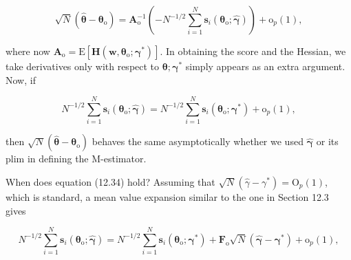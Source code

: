 \documentclass[10pt]{article}
\begin{document}
\begin{equation*}
\sqrt{N}\left(\hat{\boldsymbol{\theta}}-\boldsymbol{\theta}_{\mathrm{o}}\right)=\mathbf{A}_{\mathrm{o}}^{-1}\left(-N^{-1 / 2} \sum_{i=1}^{N} \mathbf{s}_{i}\left(\boldsymbol{\theta}_{\mathrm{o}} ; \hat{\boldsymbol{\gamma}}\right)\right)+\mathrm{o}_{p}(1), \tag{12.33}
\end{equation*}


where now $\mathbf{A}_{\mathrm{o}}=\mathrm{E}\left[\mathbf{H}\left(\mathbf{w}, \boldsymbol{\theta}_{\mathrm{o}} ; \boldsymbol{\gamma}^{*}\right)\right]$. In obtaining the score and the Hessian, we take derivatives only with respect to $\boldsymbol{\theta} ; \boldsymbol{\gamma}^{*}$ simply appears as an extra argument. Now, if


\begin{equation*}
N^{-1 / 2} \sum_{i=1}^{N} \mathbf{s}_{i}\left(\boldsymbol{\theta}_{\mathrm{o}} ; \hat{\boldsymbol{\gamma}}\right)=N^{-1 / 2} \sum_{i=1}^{N} \mathbf{s}_{i}\left(\boldsymbol{\theta}_{\mathrm{o}} ; \boldsymbol{\gamma}^{*}\right)+\mathrm{o}_{p}(1), \tag{12.34}
\end{equation*}


then $\sqrt{N}\left(\hat{\boldsymbol{\theta}}-\boldsymbol{\theta}_{\mathrm{o}}\right)$ behaves the same asymptotically whether we used $\hat{\boldsymbol{\gamma}}$ or its plim in defining the M-estimator.

When does equation (12.34) hold? Assuming that $\sqrt{N}\left(\hat{\gamma}-\gamma^{*}\right)=\mathrm{O}_{p}(1)$, which is standard, a mean value expansion similar to the one in Section 12.3 gives


\begin{equation*}
N^{-1 / 2} \sum_{i=1}^{N} \mathbf{s}_{i}\left(\boldsymbol{\theta}_{\mathrm{o}} ; \hat{\boldsymbol{\gamma}}\right)=N^{-1 / 2} \sum_{i=1}^{N} \mathbf{s}_{i}\left(\boldsymbol{\theta}_{\mathrm{o}} ; \boldsymbol{\gamma}^{*}\right)+\mathbf{F}_{\mathrm{o}} \sqrt{N}\left(\hat{\boldsymbol{\gamma}}-\boldsymbol{\gamma}^{*}\right)+\mathrm{o}_{p}(1), \tag{12.35}
\end{equation*}
\end{document}
